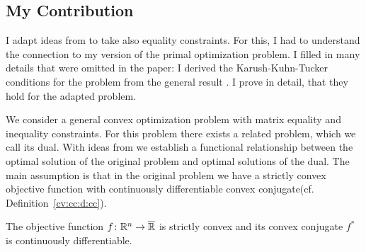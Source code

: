 \subsection*{My Contribution}
I adapt ideas from \cite{Tseng1991} to take also equality constraints. For this, I had to understand the connection to my version of the primal optimization problem. 
I filled in many details that were omitted in the paper:
I derived the Karush-Kuhn-Tucker conditions for the problem
from the general result \cite[Theorem~28.3]{Rockafellar1970}.
I prove in detail, that they hold for the adapted problem.


We consider a general convex optimization problem 
with matrix equality and inequality constraints.
For this problem there exists a related problem,
which we call its dual.
With ideas from \cite{Tseng1991} we establish 
a functional relationship
between the optimal solution of the original problem 
and
optimal solutions of the dual.
The main assumption is that in the original problem we have a strictly convex objective function 
with continuously differentiable 
convex conjugate(cf. Definition~\ref{cv:cc:d:cc}). 
\begin{assumption}
  \label{cv:ts:asu}
  The objective function $f\colon \mathbb{R}^n\to \overline{\mathbb{R}}$ is strictly convex and its
convex conjugate $f^*$ is continuously differentiable.
\end{assumption}
